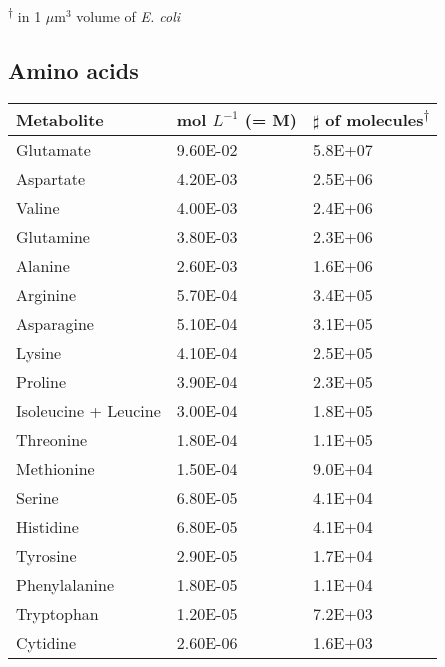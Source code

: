 \documentclass{article}
\begin{document}
            \textsuperscript{$\dagger$} in 1 $\mu$m$^{3}$ volume of \textit{E. coli}
        \subsection{Amino acids}
            \begin{tabular}{ |l|l|l| } %
                \hline
                Metabolite & mol $L^{-1}$ (= M) & $\sharp$ of molecules\textsuperscript{$\dagger$} \\ 
                \hline
                Glutamate   & \num{9.60E-02}  &    \num{5.8E+07}  \\
                Aspartate   & \num{4.20E-03}  &    \num{2.5E+06}  \\
                Valine  & \num{4.00E-03}  &   \num{2.4E+06} \\
                Glutamine   & \num{3.80E-03}  &    \num{2.3E+06}  \\
                Alanine & \num{2.60E-03}  &  \num{1.6E+06}    \\
                Arginine    & \num{5.70E-04}  &     \num{3.4E+05}   \\
                Asparagine  & \num{5.10E-04}  &   \num{3.1E+05} \\
                Lysine  & \num{4.10E-04}  &   \num{2.5E+05} \\
                Proline & \num{3.90E-04}  &  \num{2.3E+05}    \\
                Isoleucine + Leucine    & \num{3.00E-04}  &     \num{1.8E+05}   \\
                Threonine   & \num{1.80E-04}  &    \num{1.1E+05}  \\
                Methionine  & \num{1.50E-04}  &   \num{9.0E+04} \\
                Serine  & \num{6.80E-05}  &   \num{4.1E+04} \\
                Histidine   & \num{6.80E-05}  &    \num{4.1E+04}  \\
                Tyrosine    & \num{2.90E-05}  &     \num{1.7E+04}   \\
                Phenylalanine   & \num{1.80E-05}  &    \num{1.1E+04}  \\
                Tryptophan  & \num{1.20E-05}  &   \num{7.2E+03} \\
                Cytidine    & \num{2.60E-06}  &     \num{1.6E+03}   \\
                \hline
            \end{tabular}
\end{document}
